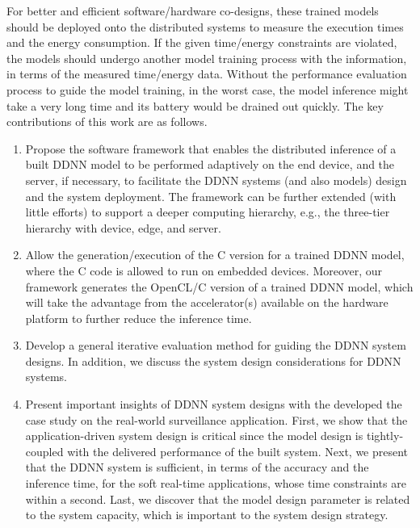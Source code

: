 \documentclass[format=acmsmall, review=false, screen=true]{acmart}
\begin{document}
For better and efficient software/hardware co-designs, these trained models should be deployed onto the distributed systems to measure the execution times and the energy consumption. If the given time/energy constraints are violated, the models should undergo another model training process with the information, in terms of the measured time/energy data. Without the performance evaluation process to guide the model training, in the worst case, the model inference might take a very long time and its battery would be drained out quickly. The key contributions of this work are as follows.
\begin{enumerate}
  \item Propose the software framework that enables the distributed inference of a built DDNN model to be performed adaptively on the end device, and the server, if necessary, to facilitate the DDNN systems (and also models) design and the system deployment. The framework can be further extended (with little efforts) to support a deeper computing hierarchy, e.g., the three-tier hierarchy with device, edge, and server.
  \item Allow the generation/execution of the C version for a trained DDNN model, where the C code is allowed to run on embedded devices. Moreover, our framework generates the OpenCL/C version of a trained DDNN model, which will take the advantage from the accelerator(s) available on the hardware platform to further reduce the inference time.
  \item Develop a general iterative evaluation method for guiding the DDNN system designs. In addition, we discuss the system design considerations for DDNN systems.
  \item Present important insights of DDNN system designs with the developed the case study on the real-world surveillance application.
  First, we show that the application-driven system design is critical since the model design is tightly-coupled with the delivered performance of the built system. Next, we present that the DDNN system is sufficient, in terms of the accuracy and the inference time, for the soft real-time applications, whose time constraints are within a second. Last, we discover that the model design parameter is related to the system capacity, which is important to the system design strategy.
\end{enumerate}
\end{document}
